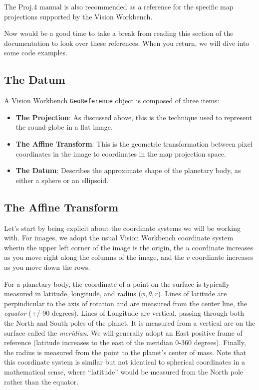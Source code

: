 The Proj.4 manual is also recommended as a reference for the specific
map projections supported by the Vision Workbench.

Now would be a good time to take a break from reading this section of
the documentation to look over these references.  When you return, we
will dive into some code examples.  

\subsection{The Datum}

A Vision Workbench \verb#GeoReference# object is composed of three items:

\begin{itemize}
\item {\bf The Projection}: As discussed above, this is the technique
  used to represent the round globe in a flat image.
\item {\bf The Affine Transform}: This is the geometric transformation
  between pixel coordinates in the image to coordinates in the map
  projection space.
\item {\bf The Datum}: Describes the approximate shape of the
  planetary body, as either a sphere or an ellipsoid.
\end{itemize}

\subsection{The Affine Transform}

Let's start by being explicit about the coordinate systems we will be
working with.  For images, we adopt the usual Vision Workbench
coordinate system wherin the upper left corner of the image is the
origin, the $u$ coordinate increases as you move right along the
columns of the image, and the $v$ coordinate increases as you move
down the rows.  

For a planetary body, the coordinate of a point on the surface is
typically measured in latitude, longitude, and radius ($\phi, \theta,
r$).  Lines of latitude are perpindicular to the axis of rotation and
are measured from the center line, the {\em equator} (+/-90 degrees).
Lines of Longitude are vertical, passing through both the North and
South poles of the planet.  It is measured from a vertical arc on the
surface called the {\em meridian}.  We will generally adopt an East
positive frame of reference (latitude increases to the east of the
meridian 0-360 degrees).  Finally, the radius is measured from the
point to the planet's center of mass.  Note that this coordinate
system is similar but not identical to spherical coordinates in a
mathematical sense, where ``latitude'' would be measured from the
North pole rather than the equator.

